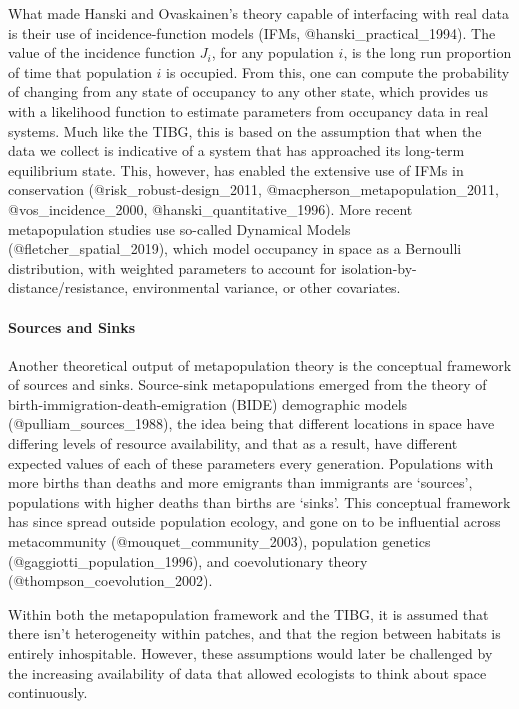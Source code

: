 What made Hanski and Ovaskainen's theory capable of interfacing with
real data is their use of incidence-function models (IFMs,
@hanski\_practical\_1994). The value of the incidence function \(J_i\),
for any population \(i\), is the long run proportion of time that
population \(i\) is occupied. From this, one can compute the probability
of changing from any state of occupancy to any other state, which
provides us with a likelihood function to estimate parameters from
occupancy data in real systems. Much like the TIBG, this is based on the
assumption that when the data we collect is indicative of a system that
has approached its long-term equilibrium state. This, however, has
enabled the extensive use of IFMs in conservation
(@risk\_robust-design\_2011, @macpherson\_metapopulation\_2011,
@vos\_incidence\_2000, @hanski\_quantitative\_1996). More recent
metapopulation studies use so-called Dynamical Models
(@fletcher\_spatial\_2019), which model occupancy in space as a
Bernoulli distribution, with weighted parameters to account for
isolation-by-distance/resistance, environmental variance, or other
covariates.

\hypertarget{sources-and-sinks}{%
\paragraph{Sources and Sinks}\label{sources-and-sinks}}

Another theoretical output of metapopulation theory is the conceptual
framework of sources and sinks. Source-sink metapopulations emerged from
the theory of birth-immigration-death-emigration (BIDE) demographic
models (@pulliam\_sources\_1988), the idea being that different
locations in space have differing levels of resource availability, and
that as a result, have different expected values of each of these
parameters every generation. Populations with more births than deaths
and more emigrants than immigrants are `sources', populations with
higher deaths than births are `sinks'. This conceptual framework has
since spread outside population ecology, and gone on to be influential
across metacommunity (@mouquet\_community\_2003), population genetics
(@gaggiotti\_population\_1996), and coevolutionary theory
(@thompson\_coevolution\_2002).

Within both the metapopulation framework and the TIBG, it is assumed
that there isn't heterogeneity within patches, and that the region
between habitats is entirely inhospitable. However, these assumptions
would later be challenged by the increasing availability of data that
allowed ecologists to think about space continuously.

